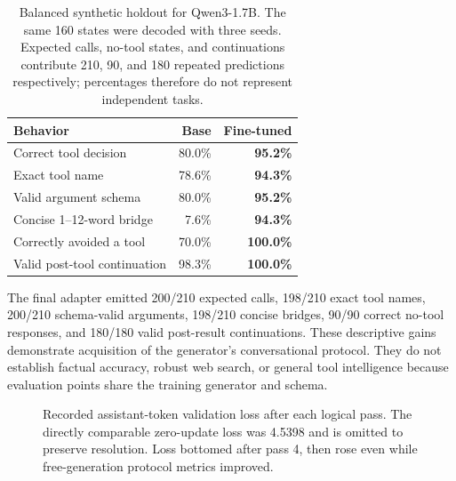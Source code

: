\documentclass[10pt,twocolumn]{article}
\begin{document}
\begin{table}[t]
\centering
\caption{Balanced synthetic holdout for Qwen3-1.7B. The same 160 states were decoded with three
seeds. Expected calls, no-tool states, and continuations contribute 210, 90, and 180 repeated
predictions respectively; percentages therefore do not represent independent tasks.}
\scriptsize
\begin{tabularx}{\columnwidth}{Xrr}
\toprule
Behavior & Base & Fine-tuned \\
\midrule
Correct tool decision & 80.0\% & \textbf{95.2\%} \\
Exact tool name & 78.6\% & \textbf{94.3\%} \\
Valid argument schema & 80.0\% & \textbf{95.2\%} \\
Concise 1--12-word bridge & 7.6\% & \textbf{94.3\%} \\
Correctly avoided a tool & 70.0\% & \textbf{100.0\%} \\
Valid post-tool continuation & 98.3\% & \textbf{100.0\%} \\
\bottomrule
\end{tabularx}
\label{tab:tool}
\end{table}

The final adapter emitted 200/210 expected calls, 198/210 exact tool names, 200/210 schema-valid
arguments, 198/210 concise bridges, 90/90 correct no-tool responses, and 180/180 valid post-result
continuations. These descriptive gains demonstrate acquisition of the generator's conversational
protocol. They do not establish factual accuracy, robust web search, or general tool intelligence
because evaluation points share the training generator and schema.

\begin{figure}[t]
\centering
{}
\caption{Recorded assistant-token validation loss after each logical pass. The directly comparable
zero-update loss was 4.5398 and is omitted to preserve resolution. Loss bottomed after pass 4, then
rose even while free-generation protocol metrics improved.}
\label{fig:loss}
\end{figure}
\end{document}
